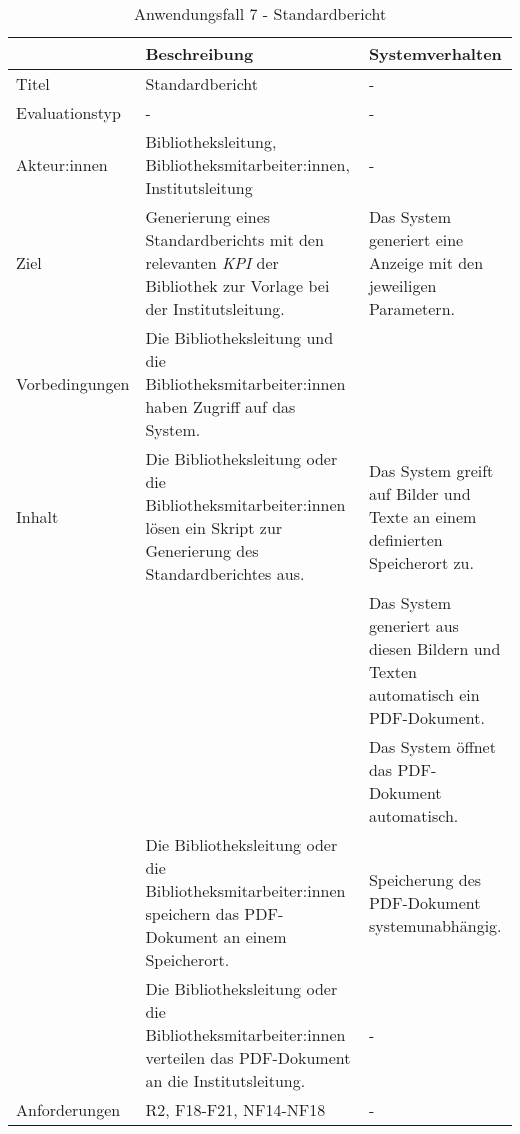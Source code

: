 \begingroup
\setlength{\tabcolsep}{9pt} %
\renewcommand{\arraystretch}{1.25} 
\begin{table}[h]
    \centering
    \begin{adjustbox}{max width=\textwidth}
    \begin{tabular}{lp{7.0cm}p{7.0cm}}
       \toprule
       \textbf{}          & \textbf{Beschreibung} &\textbf{Systemverhalten}\\
       \midrule
        Titel                            &Standardbericht& -\\
        Evaluationstyp                   &-                   & -\\
        Akteur:innen                     &Bibliotheksleitung, Bibliotheksmitarbeiter:innen, Institutsleitung& -\\
        Ziel                             &Generierung eines Standardberichts mit den relevanten \textit{\acrshort{KPI}} der Bibliothek zur Vorlage bei der Institutsleitung. & Das System generiert eine Anzeige mit den jeweiligen Parametern.\\
        Vorbedingungen                   &Die Bibliotheksleitung und die Bibliotheksmitarbeiter:innen haben Zugriff auf das System.& \\
        Inhalt                           &Die Bibliotheksleitung oder die Bibliotheksmitarbeiter:innen lösen ein Skript zur Generierung des Standardberichtes aus.& Das System greift auf Bilder und Texte an einem definierten Speicherort zu.\\
                                         & &Das System generiert aus diesen Bildern und Texten automatisch ein PDF-Dokument.\\
                                         & &Das System öffnet das PDF-Dokument automatisch.\\
                                         &Die Bibliotheksleitung oder die Bibliotheksmitarbeiter:innen speichern das PDF-Dokument an einem Speicherort. &Speicherung des PDF-Dokument systemunabhängig.\\
                                         &Die Bibliotheksleitung oder die Bibliotheksmitarbeiter:innen verteilen das PDF-Dokument an die Institutsleitung. &-\\

       

        Anforderungen                   &R2, F18-F21, NF14-NF18& -\\
        \bottomrule
    \end{tabular}
    \end{adjustbox}
    \caption{%
    Anwendungsfall 7 - Standardbericht   }
    \label{tab:AF_Standardbericht}
    \end{table}
\endgroup

